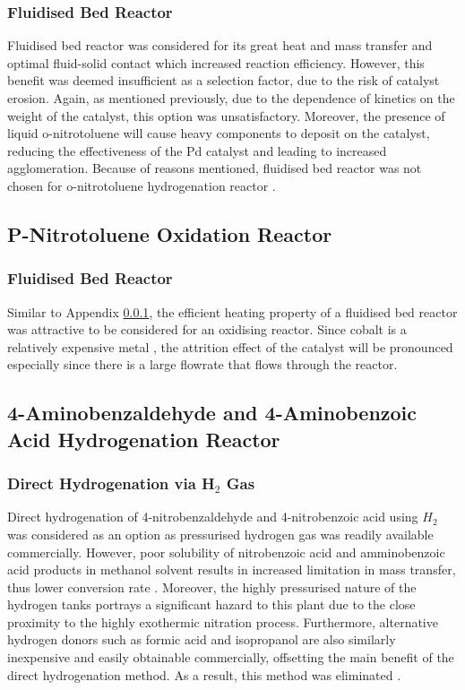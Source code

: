 \subsubsection{Fluidised Bed Reactor}
\label{fbr}
Fluidised bed reactor was considered for its great heat and mass transfer and optimal fluid-solid contact which increased reaction efficiency. However, this benefit was deemed insufficient as a selection factor, due to the risk of catalyst erosion. Again, as mentioned previously, due to the dependence of kinetics on the weight of the catalyst, this option was unsatisfactory. Moreover, the presence of liquid o-nitrotoluene will cause heavy components to deposit on the catalyst, reducing the effectiveness of the Pd catalyst and leading to increased agglomeration. Because of reasons mentioned, fluidised bed reactor was not chosen for o-nitrotoluene hydrogenation reactor \cite{farrell_kinetics_1979-1}.

\subsection{P-Nitrotoluene Oxidation Reactor}
\subsubsection{Fluidised Bed Reactor}
Similar to Appendix \ref{fbr}, the efficient heating property of a fluidised bed reactor was attractive to be considered for an oxidising reactor. Since cobalt is a relatively expensive metal \cite{saib_fundamental_2014}, the attrition effect of the catalyst will be pronounced especially since there is a large flowrate that flows through the reactor.

\subsection{4-Aminobenzaldehyde and 4-Aminobenzoic Acid Hydrogenation Reactor}
\subsubsection{Direct Hydrogenation via H$_2$ Gas}

Direct hydrogenation of 4-nitrobenzaldehyde and 4-nitrobenzoic acid using $H_2$ was considered as an option as pressurised hydrogen gas was readily available commercially. However, poor solubility of nitrobenzoic acid and amminobenzoic acid products in methanol solvent results in increased limitation in mass transfer, thus lower conversion rate \cite{rahman_fast_2020}. Moreover, the highly pressurised nature of the hydrogen tanks portrays a significant hazard to this plant due to the close proximity to the highly exothermic nitration process. Furthermore, alternative hydrogen donors such as formic acid and isopropanol are also similarly inexpensive and easily obtainable commercially, offsetting the main benefit of the direct hydrogenation method. As a result, this method was eliminated \cite{wang_golden_nodate}. 



